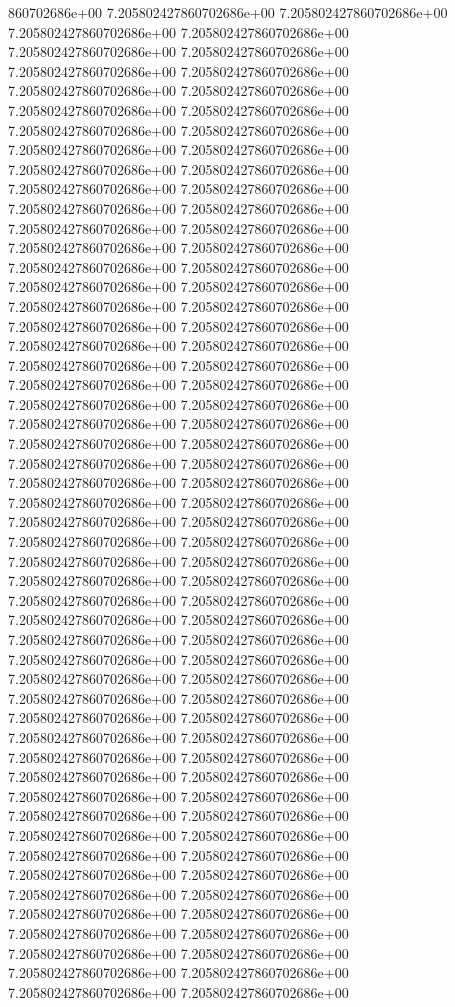 860702686e+00	7.205802427860702686e+00	7.205802427860702686e+00	7.205802427860702686e+00	7.205802427860702686e+00	7.205802427860702686e+00	7.205802427860702686e+00	7.205802427860702686e+00	7.205802427860702686e+00	7.205802427860702686e+00	7.205802427860702686e+00	7.205802427860702686e+00	7.205802427860702686e+00	7.205802427860702686e+00	7.205802427860702686e+00	7.205802427860702686e+00	7.205802427860702686e+00	7.205802427860702686e+00	7.205802427860702686e+00	7.205802427860702686e+00	7.205802427860702686e+00	7.205802427860702686e+00	7.205802427860702686e+00	7.205802427860702686e+00	7.205802427860702686e+00	7.205802427860702686e+00	7.205802427860702686e+00	7.205802427860702686e+00	7.205802427860702686e+00	7.205802427860702686e+00	7.205802427860702686e+00	7.205802427860702686e+00	7.205802427860702686e+00	7.205802427860702686e+00	7.205802427860702686e+00	7.205802427860702686e+00	7.205802427860702686e+00	7.205802427860702686e+00	7.205802427860702686e+00	7.205802427860702686e+00	7.205802427860702686e+00	7.205802427860702686e+00	7.205802427860702686e+00	7.205802427860702686e+00	7.205802427860702686e+00	7.205802427860702686e+00	7.205802427860702686e+00	7.205802427860702686e+00	7.205802427860702686e+00	7.205802427860702686e+00	7.205802427860702686e+00	7.205802427860702686e+00	7.205802427860702686e+00	7.205802427860702686e+00	7.205802427860702686e+00	7.205802427860702686e+00	7.205802427860702686e+00	7.205802427860702686e+00	7.205802427860702686e+00	7.205802427860702686e+00	7.205802427860702686e+00	7.205802427860702686e+00	7.205802427860702686e+00	7.205802427860702686e+00	7.205802427860702686e+00	7.205802427860702686e+00	7.205802427860702686e+00	7.205802427860702686e+00	7.205802427860702686e+00	7.205802427860702686e+00	7.205802427860702686e+00	7.205802427860702686e+00	7.205802427860702686e+00	7.205802427860702686e+00	7.205802427860702686e+00	7.205802427860702686e+00	7.205802427860702686e+00	7.205802427860702686e+00	7.205802427860702686e+00	7.205802427860702686e+00	7.205802427860702686e+00	7.205802427860702686e+00	7.205802427860702686e+00	7.205802427860702686e+00	7.205802427860702686e+00	7.205802427860702686e+00	7.205802427860702686e+00	7.205802427860702686e+00	7.205802427860702686e+00	7.205802427860702686e+00	7.205802427860702686e+00	7.205802427860702686e+00	7.205802427860702686e+00	7.205802427860702686e+00	7.205802427860702686e+00	7.205802427860702686e+00	7.205802427860702686e+00	7.205802427860702686e+00	7.205802427860702686e+00	7.205802427860702686e+00	7.205802427860702686e+00	7.205802427860702686e+00	7.205802427860702686e+00
